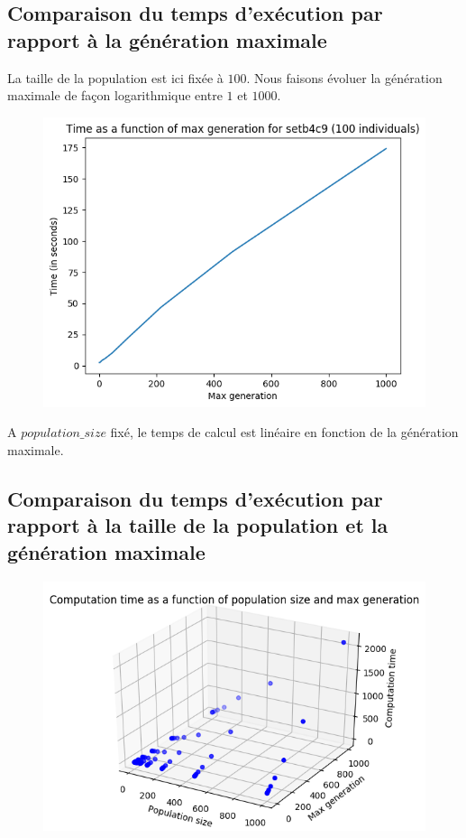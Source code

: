 \subsection{Comparaison du temps d'exécution par rapport à la génération maximale}

La taille de la population est ici fixée à $100$. Nous faisons évoluer la génération maximale de façon logarithmique entre $1$ et $1000$.

\begin{figure}[!h]
    \centering
    \includegraphics[]{report/Pictures/setb4c9_benchmarks_generation.png}
\end{figure}

A $population\_size$ fixé, le temps de calcul est linéaire en fonction de la génération maximale.

\newpage

\subsection{Comparaison du temps d'exécution par rapport à la taille de la population et la génération maximale}

\begin{figure}[!h]
    \centering
    \includegraphics[]{report/Pictures/setb4c9_benchmarks_generation_with_computation_time.png}
\end{figure}

